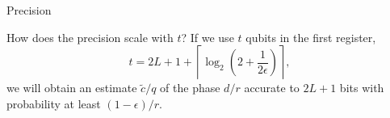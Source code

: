 \begin{frame}{Precision}
\begin{block}{How does the precision scale with $t$?}
If we use $t$ qubits in the first register, 
\begin{equation*}
t=2L + 1 + \left\lceil \log_2\left(2+\frac{1}{2\epsilon}\right) \right\rceil,
\end{equation*}
we will obtain an estimate $\tilde{c}/q$ of the phase $d/r$ accurate to $2L+1$ bits with probability at least $(1-\epsilon)/r$.
\end{block}

\end{frame}

